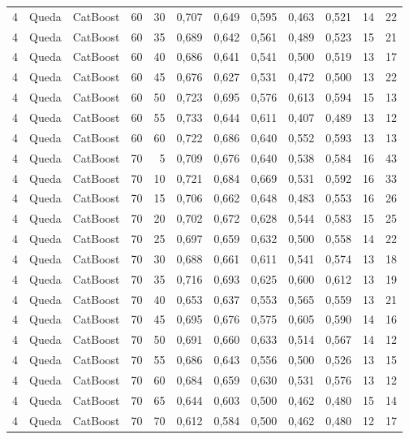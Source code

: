 \begin{longtable}{@{}rllrrrrrrrrr@{}}
4 & Queda & CatBoost & 60 & 30 & 0,707 & 0,649 & 0,595 & 0,463 & 0,521 & 14 & 22 \\
4 & Queda & CatBoost & 60 & 35 & 0,689 & 0,642 & 0,561 & 0,489 & 0,523 & 15 & 21 \\
4 & Queda & CatBoost & 60 & 40 & 0,686 & 0,641 & 0,541 & 0,500 & 0,519 & 13 & 17 \\
4 & Queda & CatBoost & 60 & 45 & 0,676 & 0,627 & 0,531 & 0,472 & 0,500 & 13 & 22 \\
4 & Queda & CatBoost & 60 & 50 & 0,723 & 0,695 & 0,576 & 0,613 & 0,594 & 15 & 13 \\
4 & Queda & CatBoost & 60 & 55 & 0,733 & 0,644 & 0,611 & 0,407 & 0,489 & 13 & 12 \\
4 & Queda & CatBoost & 60 & 60 & 0,722 & 0,686 & 0,640 & 0,552 & 0,593 & 13 & 13 \\
4 & Queda & CatBoost & 70 & 5 & 0,709 & 0,676 & 0,640 & 0,538 & 0,584 & 16 & 43 \\
4 & Queda & CatBoost & 70 & 10 & 0,721 & 0,684 & 0,669 & 0,531 & 0,592 & 16 & 33 \\
4 & Queda & CatBoost & 70 & 15 & 0,706 & 0,662 & 0,648 & 0,483 & 0,553 & 16 & 26 \\
4 & Queda & CatBoost & 70 & 20 & 0,702 & 0,672 & 0,628 & 0,544 & 0,583 & 15 & 25 \\
4 & Queda & CatBoost & 70 & 25 & 0,697 & 0,659 & 0,632 & 0,500 & 0,558 & 14 & 22 \\
4 & Queda & CatBoost & 70 & 30 & 0,688 & 0,661 & 0,611 & 0,541 & 0,574 & 13 & 18 \\
4 & Queda & CatBoost & 70 & 35 & 0,716 & 0,693 & 0,625 & 0,600 & 0,612 & 13 & 19 \\
4 & Queda & CatBoost & 70 & 40 & 0,653 & 0,637 & 0,553 & 0,565 & 0,559 & 13 & 21 \\
4 & Queda & CatBoost & 70 & 45 & 0,695 & 0,676 & 0,575 & 0,605 & 0,590 & 14 & 16 \\
4 & Queda & CatBoost & 70 & 50 & 0,691 & 0,660 & 0,633 & 0,514 & 0,567 & 14 & 12 \\
4 & Queda & CatBoost & 70 & 55 & 0,686 & 0,643 & 0,556 & 0,500 & 0,526 & 13 & 15 \\
4 & Queda & CatBoost & 70 & 60 & 0,684 & 0,659 & 0,630 & 0,531 & 0,576 & 13 & 12 \\
4 & Queda & CatBoost & 70 & 65 & 0,644 & 0,603 & 0,500 & 0,462 & 0,480 & 15 & 14 \\
4 & Queda & CatBoost & 70 & 70 & 0,612 & 0,584 & 0,500 & 0,462 & 0,480 & 12 & 17 \\

\end{longtable}
